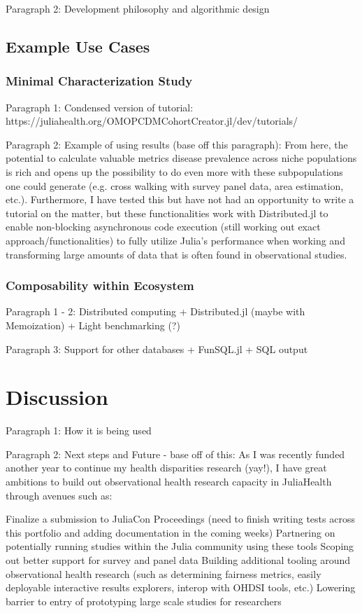 \documentclass{juliacon}
\begin{document}
Paragraph 2: Development philosophy and algorithmic design

\subsection{Example Use Cases}

\subsubsection{Minimal Characterization Study}

Paragraph 1: Condensed version of tutorial: https://juliahealth.org/OMOPCDMCohortCreator.jl/dev/tutorials/

Paragraph 2: Example of using results (base off this paragraph): From here, the potential to calculate valuable metrics disease prevalence across niche populations is rich and opens up the possibility to do even more with these subpopulations one could generate (e.g. cross walking with survey panel data, area estimation, etc.). Furthermore, I have tested this but have not had an opportunity to write a tutorial on the matter, but these functionalities work with Distributed.jl to enable non-blocking asynchronous code execution (still working out exact approach/functionalities) to fully utilize Julia’s performance when working and transforming large amounts of data that is often found in observational studies.

\subsubsection{Composability within Ecosystem} 

Paragraph 1 - 2: Distributed computing + Distributed.jl (maybe with Memoization) + Light benchmarking (?)

Paragraph 3: Support for other databases + FunSQL.jl + SQL output

\section{Discussion}

Paragraph 1: How it is being used

Paragraph 2: Next steps and Future - base off of this: As I was recently funded another year to continue my health disparities research (yay!), I have great ambitions to build out observational health research capacity in JuliaHealth through avenues such as:

Finalize a submission to JuliaCon Proceedings (need to finish writing tests across this portfolio and adding documentation in the coming weeks)
Partnering on potentially running studies within the Julia community using these tools
Scoping out better support for survey and panel data
Building additional tooling around observational health research (such as determining fairness metrics, easily deployable interactive results explorers, interop with OHDSI tools, etc.)
Lowering barrier to entry of prototyping large scale studies for researchers
\end{document}
